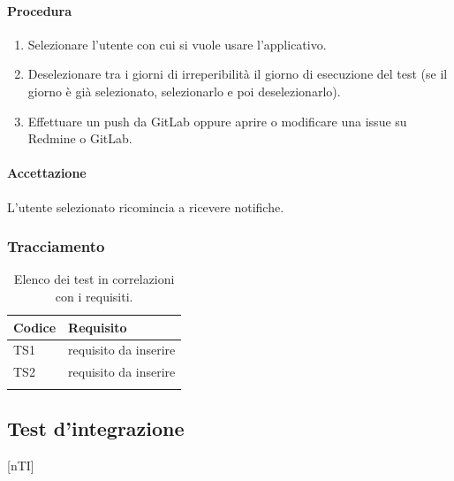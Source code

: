 		\paragraph*{Procedura}
			\begin{enumerate}
				\item Selezionare l'utente con cui si vuole usare l'applicativo.
				\item Deselezionare tra i giorni di irreperibilità il giorno di esecuzione del test (se il giorno è già selezionato, selezionarlo e poi deselezionarlo).
				\item Effettuare un push da GitLab oppure aprire o modificare una issue su Redmine o GitLab.
			\end{enumerate}
		
		\paragraph*{Accettazione}
		L'utente selezionato ricomincia a ricevere notifiche.

	\subsubsection{Tracciamento}

	\begin{table}[H]
		\centering
		{\def\arraystretch{1.4}
		\begin{tabularx}{0.7\textwidth}{YY}
			\textbf{Codice} & \textbf{Requisito} \\
			\toprule
			TS1 & requisito da inserire \\
			TS2 & requisito da inserire \\
			\bottomrule\\
		\end{tabularx}}
		\caption{Elenco dei test in correlazioni con i requisiti.}
	\end{table}
		


\subsection{Test d'integrazione} \label{testintegrazione}

[nTI]
\newcommand{\newTI}[2]{\stepcounter{nTI}TI\thenTI & #1 & #2 \\}
\newcommand{\subTI}[2]{\stepcounter{subnTI}TI\thenTI.\thesubnTI & #1 & #2 \\}



